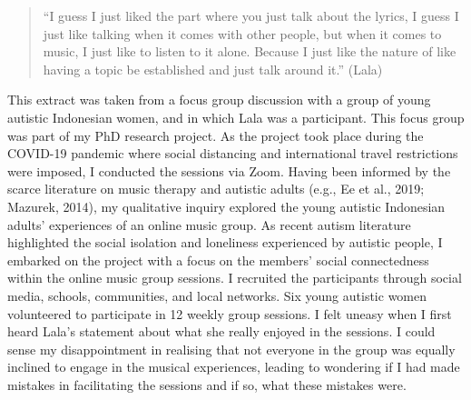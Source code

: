 \documentclass[authordate, empirical, issue]{jote-new-article}
\author[1]{Monica Subiantoro\orcid{0000-0003-0024-0410}}
\affil[1]{The University of Melbourne}
\begin{document}
\begin{frontmatter}
  \maketitle
  \begin{abstract}
    \printabstracttext
  \end{abstract}
\end{frontmatter}



\setcounter{page}{41}




\begin{quote}
  “I guess I just liked the part where you just talk about the lyrics, I guess I just like talking when it comes with other people, but when it comes to music, I just like to listen to it alone. Because I just like the nature of like having a topic be established and just talk around it.” (Lala)\
\end{quote}







This extract was taken from a focus group discussion with a group of young autistic Indonesian women, and in which Lala was a participant. This focus group was part of my PhD research project. As the project took place during the COVID-19 pandemic where social distancing and international travel restrictions were imposed, I conducted the sessions via Zoom. Having been informed by the scarce literature on music therapy and autistic adults (e.g., Ee et al., 2019; Mazurek, 2014), my qualitative inquiry explored the young autistic Indonesian adults' experiences of an online music group. As recent autism literature highlighted the social isolation and loneliness experienced by autistic people, I embarked on the project with a focus on the members' social connectedness within the online music group sessions. I recruited the participants through social media, schools, communities, and local networks. Six young autistic women volunteered to participate in 12 weekly group sessions. I felt uneasy when I first heard Lala's statement about what she really enjoyed in the sessions. I could sense my disappointment in realising that not everyone in the group was equally inclined to engage in the musical experiences, leading to wondering if I had made mistakes in facilitating the sessions and if so, what these mistakes were.
\end{document}

